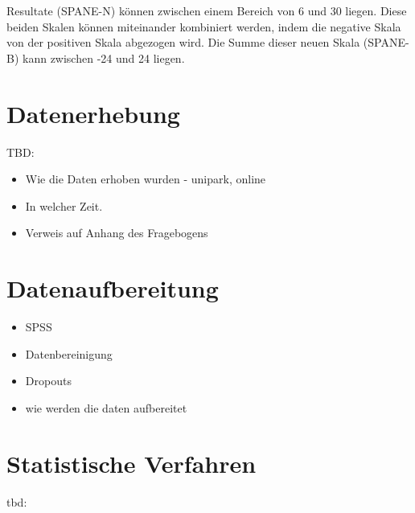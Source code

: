 Resultate (SPANE-N) können zwischen einem Bereich von 6 und 30 liegen. Diese beiden Skalen können miteinander kombiniert werden, indem die negative Skala von der positiven Skala abgezogen wird. Die Summe dieser neuen Skala (SPANE-B) kann zwischen -24 und 24 liegen.




\section{Datenerhebung}\label{section.datenerhebung}
TBD: 
\begin{itemize}
    \item Wie die Daten erhoben wurden - unipark, online 
    \item In welcher Zeit. 
    \item Verweis auf Anhang des Fragebogens
\end{itemize}


\section{Datenaufbereitung}\label{section.datenaufbereitung}
\begin{itemize}
    \item SPSS
    \item Datenbereinigung
    \item Dropouts
    \item wie werden die daten aufbereitet
\end{itemize}


\section{Statistische Verfahren}\label{section.statistischeVerfahren}
tbd:






